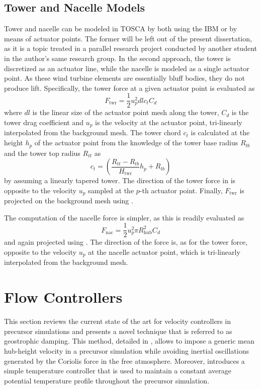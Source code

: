 \subsection{Tower and Nacelle Models}
\label{subsec:towerNacelleModels}
Tower and nacelle can be modeled in TOSCA by both using the IBM or by means of actuator points. The former will be left out of the present dissertation, as it is a topic treated in a parallel research project conducted by another student in the author's same research group. In the second approach, the tower is discretized as an actuator line, while the nacelle is modeled as a single actuator point. As these wind turbine elements are essentially bluff bodies, they do not produce lift. Specifically, the tower force at a given actuator point is evaluated as
\begin{equation}
	F_\text{twr} = \frac{1}{2}u_p^2dlc_tC_d \label{eq:towerForce}
\end{equation}
where $dl$ is the linear size of the actuator point mesh along the tower, $C_d$ is the tower drag coefficient and $u_p$ is the velocity at the actuator point, tri-linearly interpolated from the background mesh. The tower chord $c_t$ is calculated at the height $h_p$ of the actuator point from the knowledge of the tower base radius $R_{tb}$ and the tower top radius $R_{tt}$ as 
\begin{equation}
	c_t = 
		\left(
			\frac{R_{tt} - R_{tb}}{H_\text{twr}}
			h_p  
			+ R_{tb}
		\right)
\end{equation}
by assuming a linearly tapered tower. The direction of the tower force in  is opposite to the velocity $u_p$ sampled at the $p$-th actuator point. Finally, $F_\text{twr}$ is projected on the background mesh using . 

The computation of the nacelle force is simpler, as this is readily evaluated as 
\begin{equation}
	F_\text{nac} = \frac{1}{2}u_p^2\pi R_\text{hub}^2C_d \label{eq:nacelleForce}
\end{equation}
and again projected using . The direction of the force is, as for the tower force, opposite to the velocity $u_p$ at the nacelle actuator point, which is tri-linearly interpolated from the background mesh.

\section{Flow Controllers}
\label{sec:flowControllers}
This section reviews the current state of the art for velocity controllers in precursor simulations and presents a novel technique that is referred to as geostrophic damping. This method, detailed in , allows to impose a generic mean hub-height velocity in a precursor simulation while avoiding inertial oscillations generated by the Coriolis force in the free atmosphere. Moreover,  introduces a simple temperature controller that is used to maintain a constant average potential temperature profile throughout the precursor simulation. 

